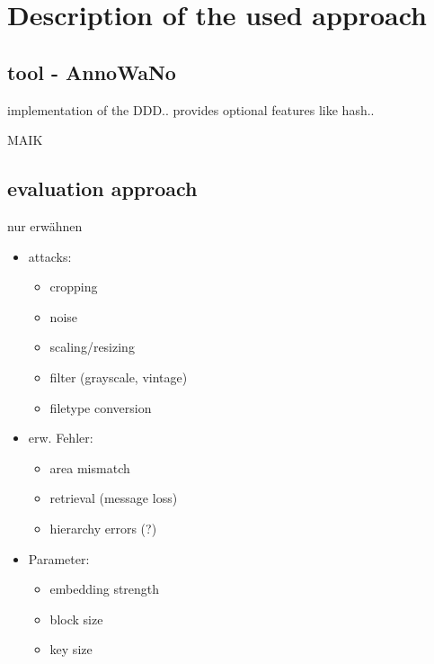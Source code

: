 \section{Description of the used approach}

\subsection{tool - AnnoWaNo} 
implementation of the DDD..
provides optional features like hash..

MAIK

\subsection{evaluation approach} 
nur erwähnen
\begin{itemize}
    \item attacks:
    \begin{itemize}
	    \item cropping
        \item noise
        \item scaling/resizing
	    \item filter (grayscale, vintage)
        \item filetype conversion
    \end{itemize}

    \item erw. Fehler:
    \begin{itemize}
	    \item area mismatch
	    \item retrieval (message loss)
        \item hierarchy errors (?)
    \end{itemize}

    \item Parameter:
    \begin{itemize}
	    \item embedding strength
	    \item block size
        \item key size
    \end{itemize}
\end{itemize}
